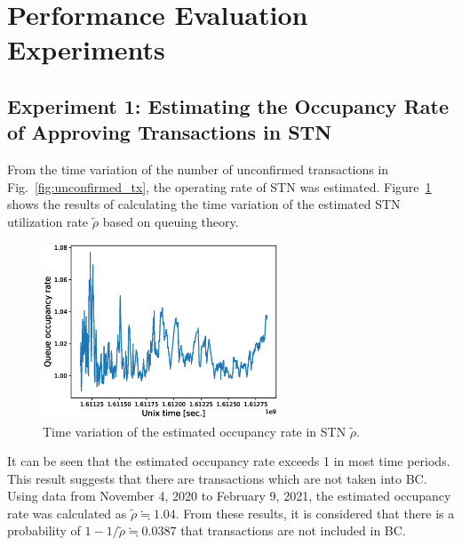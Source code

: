 \documentclass[graybox]{svmult}
\begin{document}
\section{Performance Evaluation Experiments}
\label{sec:experiments}

\subsection{Experiment 1: Estimating the Occupancy Rate of Approving Transactions in STN}
\label{sec:occupancyrate}

From the time variation of the number of unconfirmed transactions in Fig.~\ref{fig:unconfirmed_tx}, the operating rate of STN was estimated. 
Figure~\ref{fig:occupancyrate} shows the results of calculating the time variation of the estimated STN utilization rate $\tilde{\rho}$ based on queuing theory.
%
\begin{figure}[tb]
  \vspace{-35mm}
  \begin{center}
    \includegraphics[width=70mm]{bsv_stn-rho-queue_occupancy_rate.eps}
  \end{center}
  \vspace{35mm}
  \caption{Time variation of the estimated occupancy rate in STN $\tilde{\rho}$.}
  \label{fig:occupancyrate}
\end{figure}
%
It can be seen that the estimated occupancy rate exceeds 1 in most time periods. 
This result suggests that there are transactions which are not taken into BC. 
Using data from November 4, 2020 to February 9, 2021, the estimated occupancy rate was calculated as $\tilde{\rho} \fallingdotseq 1.04$. 
From these results, it is considered that there is a probability of $1 -1 / \tilde{\rho} \fallingdotseq 0.0387$ that transactions are not included in BC.
\end{document}
